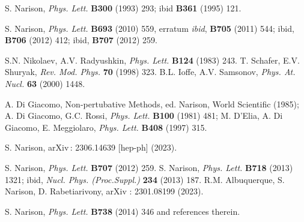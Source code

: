 \begin{thebibliography}{999}

 
 
 
 S. Narison, {\it Phys. Lett.} {\bf B300} (1993)  293; ibid
 {\bf B361} (1995)  121.
 
S. Narison,  {\it Phys. Lett.} {\bf B693}  (2010) 559, erratum {\it ibid}, %
{\bf B705} (2011) 544; 
ibid, {\bf B706}  (2012) 412; 
ibid, {\bf B707}  (2012) 259.




S.N. Nikolaev, A.V. Radyushkin,  {\it Phys. Lett.} {\bf B124} (1983) 243. 
T. Schafer, E.V. Shuryak, {\it Rev. Mod. Phys.} {\bf 70} (1998) 323.
B.L. Ioffe, A.V. Samsonov, {\it Phys. At. Nucl.} {\bf 63} (2000) 1448.






  A. Di Giacomo, Non-pertubative Methods, ed. Narison, World Scientific (1985);
   A. Di Giacomo, G.C. Rossi, {\it Phys. Lett.} {\bf B100} (1981) 481;
 M. D'Elia, A. Di Giacomo, E. Meggiolaro, {\it Phys. Lett.} {\bf B408} (1997) 315. 
 
 S. Narison, arXiv\,: 2306.14639 [hep-ph] (2023).
 
S. Narison, {\it Phys. Lett.} {\bf B707} (2012)  259.
 S. Narison, {\it Phys. Lett.} {\bf B718} (2013) 1321; ibid, {\it Nucl. Phys. (Proc.Suppl.)} {\bf 234} (2013) 187. 
 R.M.  Albuquerque, S. Narison,  D. Rabetiarivony, arXiv : 2301.08199 (2023).
 
  S. Narison,  {\it Phys. Lett.}  {\bf B738} (2014) 346 and references therein.


\end{thebibliography}
